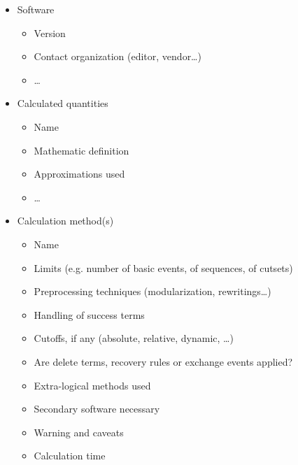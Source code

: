 \documentclass[11pt]{article}
\begin{document}
\begin{itemize}
\item Software

\begin{itemize}
\item Version

\item Contact organization (editor, vendor\ldots{})

\item \ldots{}
\end{itemize}

\item Calculated quantities

\begin{itemize}
\item Name

\item Mathematic definition

\item Approximations used

\item \ldots{}
\end{itemize}

\item Calculation method(s)

\begin{itemize}
\item Name

\item Limits (e.g. number of basic events, of sequences, of cutsets)

\item Preprocessing techniques (modularization, rewritings\ldots{})

\item Handling of success terms

\item Cutoffs, if any (absolute, relative, dynamic, \ldots{})

\item Are delete terms, recovery rules or exchange events applied?

\item Extra-logical methods used

\item Secondary software necessary

\item Warning and caveats

\item Calculation time


\end{itemize}
\end{itemize}
\end{document}
